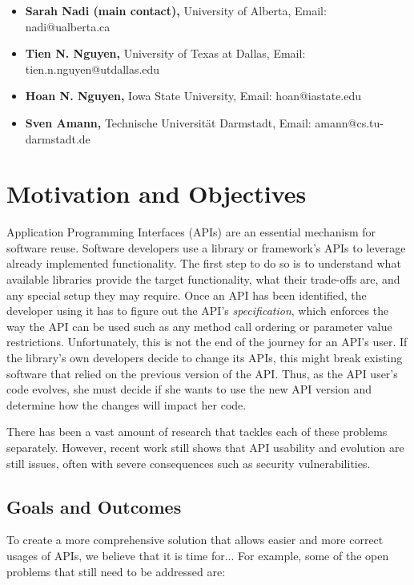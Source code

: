 \documentclass[10pt, conference]{IEEEtran}
\begin{document}
\begin{itemize}
\item \textbf{Sarah Nadi (main contact),} University of Alberta, Email: nadi@ualberta.ca
\item \textbf{Tien N. Nguyen,} University of Texas at Dallas, Email: tien.n.nguyen@utdallas.edu
\item \textbf{Hoan N. Nguyen,} Iowa State University, Email: hoan@iastate.edu
\item \textbf{Sven Amann,} Technische Universit\"{a}t Darmstadt, Email: amann@cs.tu-darmstadt.de
\end{itemize}

\section{Motivation and Objectives}
Application Programming Interfaces (APIs) are an essential mechanism for software reuse. Software developers use a library or framework's APIs to leverage already implemented functionality. The first step to do so is to understand what available libraries provide the target functionality, what their trade-offs are, and any special setup they may require. Once an API has been identified, the developer using it has to figure out the API's \textit{specification}, which enforces the way the API can be used such as any method call ordering or parameter value restrictions. Unfortunately, this is not the end of the journey for an API's user. If the library's own developers decide to change its APIs, this might break existing software that relied on the previous version of the API. Thus, as the API user's code evolves, she must decide if she wants to use the new API version and determine how the changes will impact her code.

There has been a vast amount of research that tackles each of these problems separately. However, recent work still shows that API usability and evolution are still issues, often with severe consequences such as security vulnerabilities. 

\subsection{Goals and Outcomes}
To create a more comprehensive solution that allows easier and more correct usages of APIs, we believe that it is time for... For example, some of the open problems that still need to be addressed are:
\end{document}

